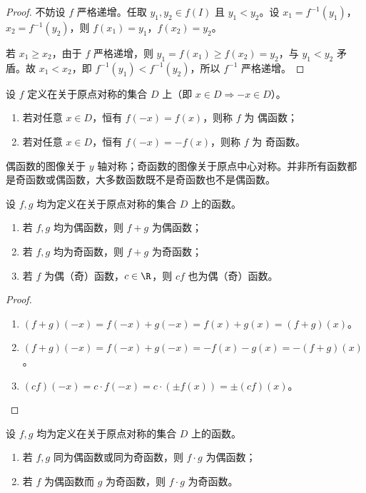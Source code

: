 \begin{proof}
	不妨设 $f$ 严格递增。任取 $y_1, y_2 \in f(I)$ 且 $y_1 < y_2$。设 $x_1 = f^{-1}(y_1)$，$x_2 = f^{-1}(y_2)$，则 $f(x_1) = y_1$，$f(x_2) = y_2$。
	
	若 $x_1 \geqslant x_2$，由于 $f$ 严格递增，则 $y_1 = f(x_1) \geqslant f(x_2) = y_2$，与 $y_1 < y_2$ 矛盾。故 $x_1 < x_2$，即 $f^{-1}(y_1) < f^{-1}(y_2)$，所以 $f^{-1}$ 严格递增。
\end{proof}


\begin{definition}
	设 $f$ 定义在关于原点对称的集合 $D$ 上（即 $x \in D \Rightarrow -x \in D$）。
	\begin{enumerate}
		\item 若对任意 $x \in D$，恒有 $f(-x) = f(x)$，则称 $f$ 为 {偶函数}；
		\item 若对任意 $x \in D$，恒有 $f(-x) = -f(x)$，则称 $f$ 为 {奇函数}。
	\end{enumerate}
\end{definition}

	偶函数的图像关于 $y$ 轴对称；奇函数的图像关于原点中心对称。并非所有函数都是奇函数或偶函数，大多数函数既不是奇函数也不是偶函数。

\begin{proposition}[奇偶性的线性组合]
	设 $f, g$ 均为定义在关于原点对称的集合 $D$ 上的函数。
	\begin{enumerate}
		\item 若 $f, g$ 均为偶函数，则 $f + g$ 为偶函数；
		\item 若 $f, g$ 均为奇函数，则 $f + g$ 为奇函数；
		\item 若 $f$ 为偶（奇）函数，$c \in \R$，则 $cf$ 也为偶（奇）函数。
	\end{enumerate}
\end{proposition}

\begin{proof}
	\begin{enumerate}
		\item $(f+g)(-x) = f(-x) + g(-x) = f(x) + g(x) = (f+g)(x)$。
		\item $(f+g)(-x) = f(-x) + g(-x) = -f(x) - g(x) = -(f+g)(x)$。
		\item $(cf)(-x) = c \cdot f(-x) = c \cdot (\pm f(x)) = \pm (cf)(x)$。
	\end{enumerate}
\end{proof}

\begin{proposition}[奇偶性的乘积]
	设 $f, g$ 均为定义在关于原点对称的集合 $D$ 上的函数。
	\begin{enumerate}
		\item 若 $f, g$ 同为偶函数或同为奇函数，则 $f \cdot g$ 为偶函数；
		\item 若 $f$ 为偶函数而 $g$ 为奇函数，则 $f \cdot g$ 为奇函数。
	\end{enumerate}
\end{proposition}

